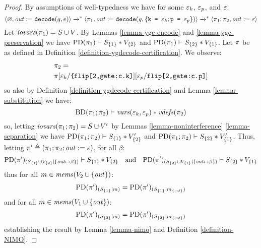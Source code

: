 \begin{proof}
  By assumptions of well-typedness we
  have for some $\varepsilon_k$, $\varepsilon_p$, and $\varepsilon$:
  $$
  \langle \varnothing,\mathit{out} := \texttt{decode}(g,e) \rangle \xrightarrow{}^{*}
  \langle \pi_1,\mathit{out} := \texttt{decode}(g,\{ \texttt{k = }\varepsilon_k;  \texttt{p = }\varepsilon_p\}) \rangle
  \xrightarrow{}^{*} \langle \pi_1;\pi_2,\mathit{out} := \varepsilon \rangle
  $$
  Let $\mathit{iovars}(\pi_1) = S \cup V$.
  By Lemmas \ref{lemma-ygc-encode} and \ref{lemma-ygc-preservation} we
  have $\mathrm{PD}(\pi_1) \vdash S_{\{1\}} * V_{\{2\}}$ and
  $\mathrm{PD}(\pi_1) \vdash S_{\{2\}} * V_{\{1\}}$.
  Let $\pi$ be as defined in Definition \ref{definition-ygdecode-certification}.
  We observe:
  \begin{eqnarray*}
    & \pi_2 = \\ 
    & \pi[\varepsilon_k/\texttt{\{flip[2,gate:c.k]}][\varepsilon_p/\texttt{flip[2,gate:c.p]}]
  \end{eqnarray*}
  so also by  Definition \ref{definition-ygdecode-certification} and
  Lemma \ref{lemma-substitution} we have:
  $$
  \mathrm{BD}(\pi_1;\pi_2) \vdash \mathit{vars}(\varepsilon_k,\varepsilon_p) * \mathit{vdefs}(\pi_2)
  $$
  so, letting $\mathit{iovars}(\pi_1;\pi_2) = S \cup V'$ by
  Lemmas \ref{lemma-noninterference} \ref{lemma-separation} we have
  $\mathrm{PD}(\pi_1;\pi_2) \vdash S_{\{1\}} * V'_{\{2\}}$ and
  $\mathrm{PD}(\pi_1;\pi_2) \vdash S_{\{2\}} * V'_{\{1\}}$.
  Thus, letting $\pi' \triangleq (\pi_1;\pi_2;\mathit{out} := \varepsilon)$, for all $\beta$:
  $$\mathrm{PD}(\pi')_{({S_{\{1\}} \cup V_{\{2\}}}|{\{ \mathit{out} \mapsto \beta \}})} \vdash S_{\{1\}} * V_{\{2\}}
  \quad \text{and} \quad
    \mathrm{PD}(\pi')_{({S_{\{2\}} \cup V_{\{1\}}}|{\{ \mathit{out} \mapsto \beta \}})} \vdash S_{\{2\}} * V_{\{1\}}$$
  thus for all $m \in \mathit{mems}(V_2 \cup \{ \mathit{out} \})$:
  $$\mathrm{PD}(\pi')_{({S_{\{1\}}}|{m})}
  = \mathrm{PD}(\pi')_{({S_{\{1\}}}|{m_{\{\mathit{out}\}}})}$$
  and for all $m \in \mathit{mems}(V_1 \cup \{ \mathit{out} \})$:
  $$\mathrm{PD}(\pi')_{({S_{\{2\}}}|{m})}
  = \mathrm{PD}(\pi')_{({S_{\{2\}}}|{m_{\{\mathit{out}\}}})}$$
  establishing the result by Lemma \ref{lemma-nimo} and Definition \ref{definition-NIMO}.
\end{proof}


